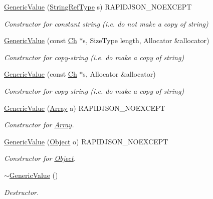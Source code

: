 \begin{DoxyCompactItemize}
\mbox{\label{classGenericValue_abb2887958974fef1b2b5c8e32cc72ddb}} 
\hyperlink{classGenericValue_abb2887958974fef1b2b5c8e32cc72ddb}{Generic\+Value} (\hyperlink{classGenericValue_a32e0f30ee278072374c8168b14d3317f}{String\+Ref\+Type} s) R\+A\+P\+I\+D\+J\+S\+O\+N\+\_\+\+N\+O\+E\+X\+C\+E\+PT
\begin{DoxyCompactList}\small\item\em Constructor for constant string (i.\+e. do not make a copy of string) \end{DoxyCompactList}\item 
\mbox{\label{classGenericValue_a9ec2c7cda8c8845acfa3565c6b1b4e10}} 
\hyperlink{classGenericValue_a9ec2c7cda8c8845acfa3565c6b1b4e10}{Generic\+Value} (const \hyperlink{classGenericValue_ade0e0ce64ccd5d852da57a35e720bafb}{Ch} $\ast$s, Size\+Type length, Allocator \&allocator)
\begin{DoxyCompactList}\small\item\em Constructor for copy-\/string (i.\+e. do make a copy of string) \end{DoxyCompactList}\item 
\mbox{\label{classGenericValue_a9b72b2e3347d4cd77b16c3b45e8decf1}} 
\hyperlink{classGenericValue_a9b72b2e3347d4cd77b16c3b45e8decf1}{Generic\+Value} (const \hyperlink{classGenericValue_ade0e0ce64ccd5d852da57a35e720bafb}{Ch} $\ast$s, Allocator \&allocator)
\begin{DoxyCompactList}\small\item\em Constructor for copy-\/string (i.\+e. do make a copy of string) \end{DoxyCompactList}\item 
\hyperlink{classGenericValue_a953052ef91e54aabe9bdb9f9eaebf6cc}{Generic\+Value} (\hyperlink{structGenericValue_1_1Array}{Array} a) R\+A\+P\+I\+D\+J\+S\+O\+N\+\_\+\+N\+O\+E\+X\+C\+E\+PT
\begin{DoxyCompactList}\small\item\em Constructor for \hyperlink{structGenericValue_1_1Array}{Array}. \end{DoxyCompactList}\item 
\hyperlink{classGenericValue_a9c294e56f4ab940f845f7c171b183483}{Generic\+Value} (\hyperlink{structGenericValue_1_1Object}{Object} o) R\+A\+P\+I\+D\+J\+S\+O\+N\+\_\+\+N\+O\+E\+X\+C\+E\+PT
\begin{DoxyCompactList}\small\item\em Constructor for \hyperlink{structGenericValue_1_1Object}{Object}. \end{DoxyCompactList}\item 
\hyperlink{classGenericValue_a213ba89ef5ef961a5e655bd8c78ac9f4}{$\sim$\+Generic\+Value} ()
\begin{DoxyCompactList}\small\item\em Destructor. \end{DoxyCompactList}\end{DoxyCompactItemize}


